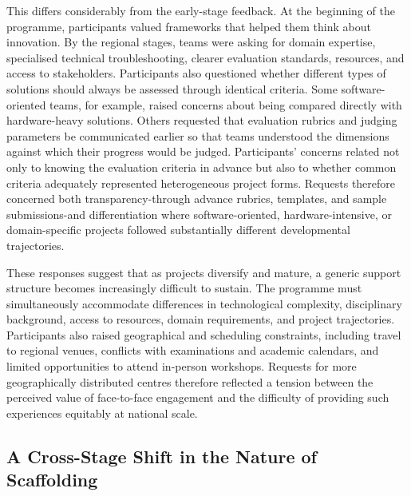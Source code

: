 \documentclass[runningheads]{llncs}
\begin{document}
This differs considerably from the early-stage feedback. At the beginning of the programme, participants valued frameworks that helped them think about innovation. By the regional stages, teams were asking for domain expertise, specialised technical troubleshooting, clearer evaluation standards, resources, and access to stakeholders. Participants also questioned whether different types of solutions should always be assessed through identical criteria. Some software-oriented teams, for example, raised concerns about being compared directly with hardware-heavy solutions. Others requested that evaluation rubrics and judging parameters be communicated earlier so that teams understood the dimensions against which their progress would be judged. Participants’ concerns related not only to knowing the evaluation criteria in advance but also to whether common criteria adequately represented heterogeneous project forms. Requests therefore concerned both transparency-through advance rubrics, templates, and sample submissions-and differentiation where software-oriented, hardware-intensive, or domain-specific projects followed substantially different developmental trajectories.

These responses suggest that as projects diversify and mature, a generic support structure becomes increasingly difficult to sustain. The programme must simultaneously accommodate differences in technological complexity, disciplinary background, access to resources, domain requirements, and project trajectories. Participants also raised geographical and scheduling constraints, including travel to regional venues, conflicts with examinations and academic calendars, and limited opportunities to attend in-person workshops. Requests for more geographically distributed centres therefore reflected a tension between the perceived value of face-to-face engagement and the difficulty of providing such experiences equitably at national scale.

\subsection{A Cross-Stage Shift in the Nature of Scaffolding}
\end{document}
